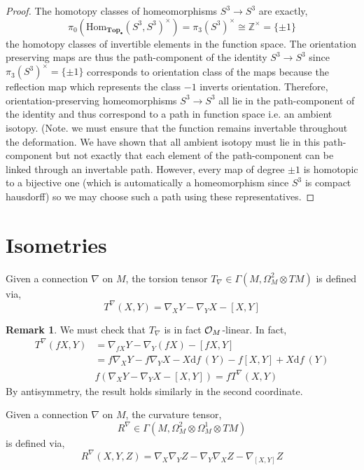\documentclass[12pt]{extarticle}
\newcommand{\Hom}[3]{\mathrm{Hom}_{#1}\left( #2, #3 \right)}
\newcommand{\Z}{\mathbb{Z}}
\renewcommand{\d}[1]{ \mathrm{d}#1 \:}
\theoremstyle{definition}
\newtheorem{remark}{Remark}
\newenvironment{definition}[1][Definition:]{\begin{trivlist}
\item[\hskip \labelsep {\bfseries #1}]}{\end{trivlist}}
\begin{document}
\begin{proof}
The homotopy classes of homeomorphisms $S^3 \to S^3$ are exactly,
\[ \pi_0(\Hom{\mathbf{Top}_\bullet}{S^3}{S^3}^\times) = \pi_3(S^3)^\times \cong \Z^\times = \{ \pm 1 \} \]
the homotopy classes of invertible elements in the function space. The orientation preserving maps are thus the path-component of the identity $S^3 \to S^3$ since $\pi_3(S^3)^\times = \{\pm 1\}$ corresponds to orientation class of the maps because the reflection map which represents the class $-1$ inverts orientation. Therefore, orientation-preserving homeomorphisms $S^3 \to S^3$ all lie in the path-component of the identity and thus correspond to a path in function space i.e. an ambient isotopy. (Note. we must ensure that the function remains invertable throughout the deformation. We have shown that all ambient isotopy must lie in this path-component but not exactly that each element of the path-component can be linked through an invertable path. However, every map of degree $\pm 1$ is homotopic to a bijective one (which is automatically a homeomorphism since $S^3$ is compact hausdorff) so we may choose such a path using these representatives.  
\end{proof}

\section{Isometries}

\newcommand{\X}{\mathscr{X}}

\begin{definition}
Given a connection $\nabla$ on $M$, the torsion tensor $T_\nabla \in \Gamma(M, \Omega^{2}_M \otimes TM)$ is defined via,
\[ T^\nabla(X, Y) = \nabla_X Y - \nabla_Y X - [X, Y] \]
\end{definition}

\begin{remark}
We must check that $T_\nabla$ is in fact $\mathcal{O}_{M}$-linear. In fact,
\begin{align*}
T^\nabla(fX, Y) & = \nabla_{f X} Y - \nabla_Y (f X) - [f X, Y] 
\\
& = f \nabla_X Y - f \nabla_Y X - X \d{f}(Y) - f [X, Y] + X \d{f}(Y) 
\\
& f \left( \nabla_X Y - \nabla_Y X - [X, Y] \right) = f T^\nabla(X, Y)
\end{align*}
By antisymmetry, the result holds similarly in the second coordinate.
\end{remark}

\begin{definition}
Given a connection $\nabla$ on $M$, the curvature tensor,
\[ R^\nabla \in \Gamma(M, \Omega_M^2 \otimes \Omega_M^1 \otimes TM) \]
is defined via,
\[ R^\nabla(X, Y, Z) = \nabla_X \nabla_Y Z - \nabla_Y \nabla_X Z - \nabla_{[X, Y]} Z \]
\end{definition}
\end{document}
